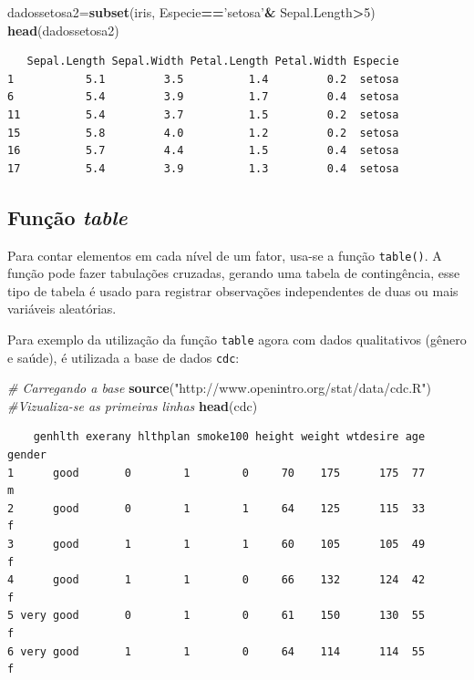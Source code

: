 \documentclass[12pt,brazil,oneside]{book}
\newenvironment{Shaded}{\begin{snugshade}}{\end{snugshade}}
\newcommand{\CommentTok}[1]{\textcolor[rgb]{0.56,0.35,0.01}{\textit{#1}}}
\newcommand{\DecValTok}[1]{\textcolor[rgb]{0.00,0.00,0.81}{#1}}
\newcommand{\KeywordTok}[1]{\textcolor[rgb]{0.13,0.29,0.53}{\textbf{#1}}}
\newcommand{\NormalTok}[1]{#1}
\newcommand{\OperatorTok}[1]{\textcolor[rgb]{0.81,0.36,0.00}{\textbf{#1}}}
\newcommand{\StringTok}[1]{\textcolor[rgb]{0.31,0.60,0.02}{#1}}
\begin{document}
\begin{Shaded}
\begin{Highlighting}[]
\NormalTok{dadossetosa2=}\KeywordTok{subset}\NormalTok{(iris, Especie}\OperatorTok{==}\StringTok{'setosa'}\OperatorTok{&}\StringTok{ }\NormalTok{Sepal.Length}\OperatorTok{>}\DecValTok{5}\NormalTok{)}
\KeywordTok{head}\NormalTok{(dadossetosa2)}
\end{Highlighting}
\end{Shaded}

\begin{verbatim}
   Sepal.Length Sepal.Width Petal.Length Petal.Width Especie
1           5.1         3.5          1.4         0.2  setosa
6           5.4         3.9          1.7         0.4  setosa
11          5.4         3.7          1.5         0.2  setosa
15          5.8         4.0          1.2         0.2  setosa
16          5.7         4.4          1.5         0.4  setosa
17          5.4         3.9          1.3         0.4  setosa
\end{verbatim}

\hypertarget{funcao-table}{%
\subsection{\texorpdfstring{Função \emph{table}}{Função table}}\label{funcao-table}}

Para contar elementos em cada nível de um fator, usa-se a função \texttt{table()}. A função pode fazer tabulações cruzadas, gerando uma tabela de contingência, esse tipo de tabela é usado para registrar observações independentes de duas ou mais variáveis aleatórias.

Para exemplo da utilização da função \texttt{table} agora com dados qualitativos (gênero e saúde), é utilizada a base de dados \texttt{cdc}:

\begin{Shaded}
\begin{Highlighting}[]
\CommentTok{# Carregando a base}
\KeywordTok{source}\NormalTok{(}\StringTok{"http://www.openintro.org/stat/data/cdc.R"}\NormalTok{)}
\CommentTok{#Vizualiza-se as primeiras linhas}
\KeywordTok{head}\NormalTok{(cdc)}
\end{Highlighting}
\end{Shaded}

\begin{verbatim}
    genhlth exerany hlthplan smoke100 height weight wtdesire age gender
1      good       0        1        0     70    175      175  77      m
2      good       0        1        1     64    125      115  33      f
3      good       1        1        1     60    105      105  49      f
4      good       1        1        0     66    132      124  42      f
5 very good       0        1        0     61    150      130  55      f
6 very good       1        1        0     64    114      114  55      f
\end{verbatim}
\end{document}
